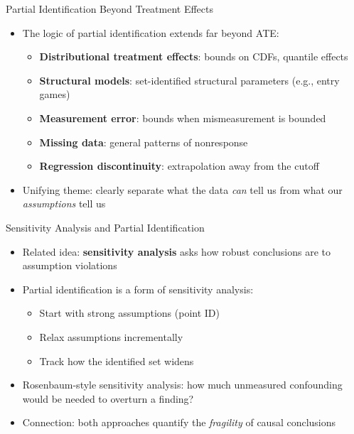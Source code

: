 \documentclass[10pt]{beamer}
\begin{document}

\begin{frame}{Partial Identification Beyond Treatment Effects}
  \begin{itemize}
    \item The logic of partial identification extends far beyond ATE:
      \begin{itemize}
        \item \textbf{Distributional treatment effects}: bounds on CDFs, quantile effects
        \item \textbf{Structural models}: set-identified structural parameters (e.g., entry games)
        \item \textbf{Measurement error}: bounds when mismeasurement is bounded
        \item \textbf{Missing data}: general patterns of nonresponse
        \item \textbf{Regression discontinuity}: extrapolation away from the cutoff
      \end{itemize}
    \item Unifying theme: clearly separate what the data \textit{can} tell us from what our \textit{assumptions} tell us
  \end{itemize}
\end{frame}

\begin{frame}{Sensitivity Analysis and Partial Identification}
  \begin{itemize}
    \item Related idea: \textbf{sensitivity analysis} asks how robust conclusions are to assumption violations
    \item Partial identification is a form of sensitivity analysis:
      \begin{itemize}
        \item Start with strong assumptions (point ID)
        \item Relax assumptions incrementally
        \item Track how the identified set widens
      \end{itemize}
    \item Rosenbaum-style sensitivity analysis: how much unmeasured confounding would be needed to overturn a finding?
    \item Connection: both approaches quantify the \textit{fragility} of causal conclusions
  \end{itemize}
\end{frame}
\end{document}
